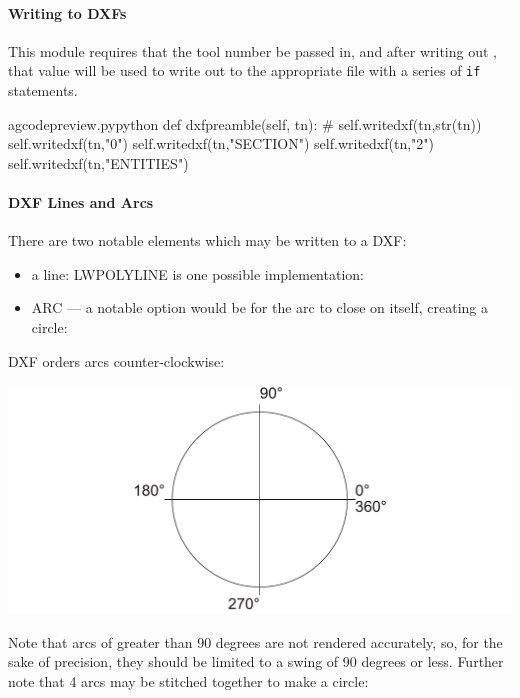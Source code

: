 \documentclass{ltxdoc}
\begin{document}
\paragraph{Writing to DXFs}%

This module requires that the tool number be passed in, and after writing out , that value will be used to write out to the appropriate file with a series of \texttt{if} statements.
 
\lstset{firstnumber=\thegcpy}
\begin{writecode}{a}{gcodepreview.py}{python}
    def dxfpreamble(self, tn):
#        self.writedxf(tn,str(tn))
        self.writedxf(tn,"0")
        self.writedxf(tn,"SECTION")
        self.writedxf(tn,"2")
        self.writedxf(tn,"ENTITIES")

\end{writecode}
\addtocounter{gcpy}{7}
 
\paragraph{DXF Lines and Arcs}%
 
There are two notable elements which may be written to a DXF:

\begin{itemize}
 \item a line: LWPOLYLINE is one possible implementation:  
 \item ARC --- a notable option would be for the arc to close on itself, creating a circle:
\end{itemize}
 
DXF orders arcs counter-clockwise:

\noindent\includegraphics[width=\linewidth]{images/arcs_circle_degrees.pdf}%

Note that arcs of greater than 90 degrees are not rendered accurately, so, for the sake of precision, they should be limited to a swing of 90 degrees or less. Further note that 4 arcs may be stitched together to make a circle:
 
\end{document}

